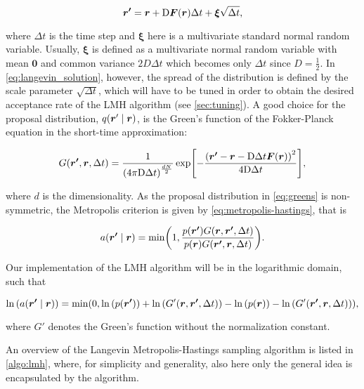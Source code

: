 \begin{equation}\label{eq:langevin_solution}
    \bm{r'} = \bm{r} + \mathrm{D}\bm{F}\qty(\bm{r})\Delta t + \bm{\xi}\sqrt{\Delta t},
\end{equation}



where $\Delta t$ is the time step and $\bm{\xi}$ here is a multivariate standard normal random variable. Usually, $\bm{\xi}$ is defined as a multivariate normal random variable with mean $\bm{0}$ and common variance $2 D \Delta t$ which becomes only $\Delta t$ since $D=\frac{1}{2}$. In \autoref{eq:langevin_solution}, however, the spread of the distribution is defined by the scale parameter $\sqrt{\Delta t}$, which will have to be tuned in order to obtain the desired acceptance rate of the LMH algorithm (see \autoref{sec:tuning}). A good choice for the proposal distribution, $q\qty(\bm{r}' \mid \bm{r})$, is the Green's function of the Fokker-Planck equation in the short-time approximation:

\begin{equation}\label{eq:greens}
    G\qty(\bm{r'}, \bm{r}, \Delta t) = \frac{1}{\qty(4\pi\mathrm{D}\Delta t)^{\frac{dN}{2}}}\exp[-\frac{\qty(\bm{r'}-\bm{r}-\mathrm{D}\Delta t\bm{F}\qty(\bm{r}))^2}{4\mathrm{D}\Delta t}],
\end{equation}

where $d$ is the dimensionality. As the proposal distribution in \autoref{eq:greens} is non-symmetric, the Metropolis criterion is given by \autoref{eq:metropolis-hastings}, that is

\begin{equation}
    a\qty(\bm{r'}\mid\bm{r}) = \mathrm{min}\qty(1, \frac{p\qty({\bm{r'}})G\qty(\bm{r}, \bm{r'}, \Delta t)}{p\qty({\bm{r}})G\qty(\bm{r'}, \bm{r}, \Delta t)}).
\end{equation}

Our implementation of the LMH algorithm will be in the logarithmic domain, such that

\begin{equation}\label{eq:log_lmh}
    \ln{\qty(a\qty(\bm{r'}\mid\bm{r}))} = \mathrm{min}\qty(0, \ln{\qty(p\qty(\bm{r'}))} + \ln{\qty(G'\qty(\bm{r}, \bm{r'}, \Delta t))} - \ln{\qty(p\qty(\bm{r}))}-\ln{\qty(G'\qty(\bm{r'}, \bm{r}, \Delta t))}),
\end{equation}

where $G'$ denotes the Green's function without the normalization constant.

An overview of the Langevin Metropolis-Hastings sampling algorithm is listed in \autoref{algo:lmh}, where, for simplicity and generality, also here only the general idea is encapsulated by the algorithm. 

